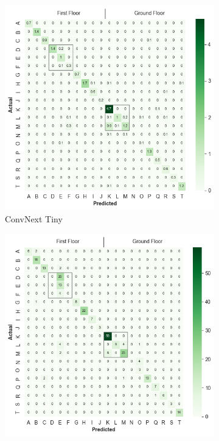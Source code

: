 \documentclass[a4paper]{article}
\begin{document}
\begin{figure}
  \centering
  \begin{subfigure}[b]{0.49\textwidth}
    \includegraphics[width=\textwidth]{./figures/conf-matrix-convnext_tiny.png}
    \caption{ConvNext Tiny}
  \end{subfigure}
  \begin{subfigure}[b]{0.49\textwidth}
    \includegraphics[width=\textwidth]{./figures/conf-matrix-r(2+1)d.png}

\end{subfigure}
\end{figure}
\end{document}

